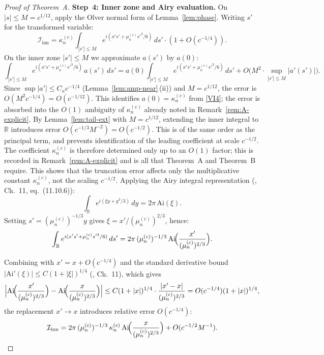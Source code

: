 \documentclass[12pt,a4paper]{amsart}
\theoremstyle{definition}
\theoremstyle{remark}
\newcommand{\Ai}{\mathrm{Ai}}
\begin{document}
\begin{proof}[Proof of Theorem~A]
\medskip
\noindent\textbf{Step~4: Inner zone and Airy evaluation.}
On $|s| \le M = c^{1/12}$,
apply the Olver normal form of Lemma~\ref{lem:phase}.
Writing $s'$ for the transformed variable:
\[
  \mathcal{I}_{\mathrm{inn}}
  = \kappa_n^{(c)}
    \int_{|s'| \le M}
    e^{i(x's' + \mu_n^{(c)}s'^3/6)}\,ds'
    \cdot(1 + O(c^{-1/4})).
\]
On the inner zone $|s'| \le M$ we approximate $a(s')$ by $a(0)$:
\[
  \int_{|s'|\le M} e^{i(x's'+\mu_n^{(c)}s'^3/6)}\,a(s')\,ds'
  = a(0)\int_{|s'|\le M} e^{i(x's'+\mu_n^{(c)}s'^3/6)}\,ds'
  + O\!\bigl(M^2 \cdot \sup_{|s'|\le M}|a'(s')|\bigr).
\]
Since $\sup|a'| \le C_\kappa c^{-1/4}$
(Lemma~\ref{lem:amp-near}\,(ii)) and $M = c^{1/12}$,
the error is $O(M^2 c^{-1/4}) = O(c^{-1/12})$.
This identifies $a(0) = \kappa_n^{(c)}$
from \eqref{VI4}; the error is absorbed into the $O(1)$ ambiguity
of $\kappa_n^{(c)}$ already noted in Remark~\ref{rem:A-explicit}.
By Lemma~\ref{lem:tail-ext} with $M = c^{1/12}$,
extending the inner integral to $\mathbb{R}$ introduces error
$O(c^{-1/3}M^{-2}) = O(c^{-1/2})$.
This is of the same order as the principal term,
and prevents identification of the leading coefficient at scale $c^{-1/2}$.
The coefficient $\kappa_n^{(c)}$ is therefore determined only up to an
$O(1)$ factor; this is recorded in Remark~\ref{rem:A-explicit}
and is all that Theorem~A and Theorem~B require.
This shows that the truncation error affects only the
multiplicative constant $\kappa_n^{(c)}$,
not the scaling $c^{-1/2}$.
Applying the Airy integral representation
\textup{(\cite{Olver1974}, Ch.~11, eq.~(11.10.6))}:
\begin{equation}
\label{eq:airy-integral}
  \int_{\mathbb{R}}
  e^{i(\xi y + y^3/3)}\,dy
  = 2\pi\,\Ai(\xi).
\end{equation}
Setting $s' = (\mu_n^{(c)})^{-1/3}y$ gives
$\xi = x'/(\mu_n^{(c)})^{2/3}$, hence:
\[
  \int_{\mathbb{R}}
  e^{i(x's' + \mu_n^{(c)}s'^3/6)}\,ds'
  = 2\pi\,(\mu_n^{(c)})^{-1/3}\,
    \Ai\!\Bigl(\frac{x'}{(\mu_n^{(c)})^{2/3}}\Bigr).
\]

Combining with $x' = x + O(c^{-1/4})$
and the standard derivative bound
$|\Ai'(\xi)| \le C(1+|\xi|)^{1/4}$
(\cite{Olver1974}, Ch.~11),
which gives
\[
  \Bigl|\Ai\!\Bigl(\frac{x'}{(\mu_n^{(c)})^{2/3}}\Bigr)
  - \Ai\!\Bigl(\frac{x}{(\mu_n^{(c)})^{2/3}}\Bigr)\Bigr|
  \le C(1+|x|)^{1/4} \cdot
  \frac{|x'-x|}{(\mu_n^{(c)})^{2/3}}
  = O(c^{-1/4})(1+|x|)^{1/4},
\]
the replacement $x' \to x$
introduces relative error $O(c^{-1/4})$:
\[
  \mathcal{I}_{\mathrm{inn}}
  = 2\pi\,(\mu_n^{(c)})^{-1/3}\,\kappa_n^{(c)}\,
    \Ai\!\Bigl(\frac{x}{(\mu_n^{(c)})^{2/3}}\Bigr)
  + O(c^{-1/2}M^{-1}).
\]


\end{proof}
\end{document}
